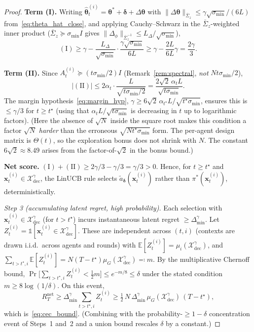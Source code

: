 \documentclass[11pt]{article}
\begin{document}
\begin{proof}
\textbf{Term (I).}
Writing $\widehat{\bm{\theta}}_t^{(i)}=\bm{\theta}^{\!*}+\bm{\delta}+\Delta\bm{\theta}$
with $\|\Delta\bm{\theta}\|_{\bar{\Sigma}_z}\leq\gamma\sqrt{\sigma_{\min}}/(6L)$
from~\eqref{eq:theta_hat_close}, and applying Cauchy--Schwarz
in the $\bar{\Sigma}_z$-weighted inner product
($\bar{\Sigma}_z\succeq\sigma_{\min}I$ gives
$\|\Delta_\phi\|_{\bar{\Sigma}_z^{-1}}\leq L_\Delta/\sqrt{\sigma_{\min}}$),
\[
(\mathrm{I})\geq\gamma-\frac{L_\Delta}{\sqrt{\sigma_{\min}}}
\cdot\frac{\gamma\sqrt{\sigma_{\min}}}{6L}\geq\gamma-\frac{2L}{6L}\gamma
=\frac{2\gamma}{3}.
\]

\textbf{Term (II).}
Since $A_t^{(i)}\succeq(t\sigma_{\min}/2)I$ (Remark~\ref{rem:spectral},
\emph{not} $Nt\sigma_{\min}/2$),
\[
|(\mathrm{II})|\leq 2\alpha_t\cdot\frac{L}{\sqrt{t\sigma_{\min}/2}}
=\frac{2\sqrt{2}\,\alpha_t L}{\sqrt{t\sigma_{\min}}}.
\]
The margin hypothesis~\eqref{eq:margin_hyp},
$\gamma\geq 6\sqrt{2}\,\alpha_{t^\star}L/\sqrt{t^\star\sigma_{\min}}$,
ensures this is $\leq\gamma/3$ for $t\geq t^\star$ (using that
$\alpha_t L/\sqrt{t\sigma_{\min}}$ is decreasing in $t$ up to
logarithmic factors).
(Here the absence of $\sqrt N$ inside the square root makes this
condition a factor $\sqrt N$ \emph{harder} than the erroneous
$\sqrt{Nt^\star\sigma_{\min}}$ form. The per-agent design matrix is
$\Theta(t)$, so the exploration bonus does not shrink with $N$.  The
constant $6\sqrt 2\approx 8.49$ arises from the factor-of-$\sqrt 2$ in
the bonus bound.)

\textbf{Net score.}
$(\mathrm{I})+(\mathrm{II})\geq 2\gamma/3-\gamma/3=\gamma/3>0$.
Hence, for $t\geq t^\star$ and $\bm{x}_t^{(i)}\in\mathcal{X}_{\mathrm{dec}}^\gamma$,
the LinUCB rule selects $\tilde{a}_{\bm{\delta}}(\bm{x}_t^{(i)})$
rather than $\pi^{\!*}(\bm{x}_t^{(i)})$, deterministically.

\textit{Step 3 (accumulating latent regret, high probability).}
Each selection with $\bm{x}_t^{(i)}\in\mathcal{X}_{\mathrm{dec}}^\gamma$
(for $t>t^\star$) incurs instantaneous latent regret
$\geq\Delta_{\min}^\gamma$.  Let
$Z_t^{(i)}=\mathbb{1}[\bm{x}_t^{(i)}\in\mathcal{X}_{\mathrm{dec}}^\gamma]$.
These are independent across $(t,i)$ (contexts are drawn i.i.d.\
across agents and rounds) with
$\mathbb{E}[Z_t^{(i)}]=\mu_i(\mathcal{X}_{\mathrm{dec}}^\gamma)$, and
$\sum_{t>t^\star,i}\mathbb{E}[Z_t^{(i)}]
=N(T-t^\star)\mu_G(\mathcal{X}_{\mathrm{dec}}^\gamma)\eqqcolon m$.
By the multiplicative Chernoff bound,
$\Pr\bigl[\sum_{t>t^\star,i}Z_t^{(i)}<\tfrac12 m\bigr]\leq e^{-m/8}\leq\delta$
under the stated condition $m\geq 8\log(1/\delta)$.  On this event,
\[
R_T^{\mathrm{net}}\geq\Delta_{\min}^\gamma\sum_{t>t^\star,i}Z_t^{(i)}
\geq\tfrac12\,N\,\Delta_{\min}^\gamma\,\mu_G(\mathcal{X}_{\mathrm{dec}}^\gamma)\,(T-t^\star),
\]
which is~\eqref{eq:cec_bound}.  (Combining with the
probability-$\geq 1-\delta$ concentration event of Steps~1 and~2 and a
union bound rescales $\delta$ by a constant.)
\end{proof}
\end{document}
